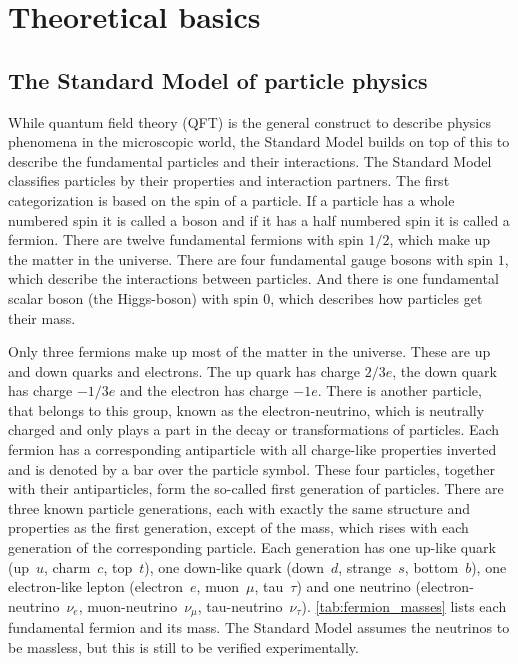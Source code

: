 \chapter{Theoretical basics}


\section{The Standard Model of particle physics}

While quantum field theory (QFT) is the general construct to describe physics phenomena in the microscopic world, the Standard Model builds on top of this to describe the fundamental particles and their interactions.
The Standard Model classifies particles by their properties and interaction partners. 
The first categorization is based on the spin of a particle. If a particle has a whole numbered spin it is called a boson and if it has a half numbered spin it is called a fermion.
There are twelve fundamental fermions with spin $1/2$, which make up the matter in the universe.
There are four fundamental gauge bosons with spin $1$, which describe the interactions between particles. 
And there is one fundamental scalar boson (the Higgs-boson) with spin $0$, which describes how particles get their mass.

Only three fermions make up most of the matter in the universe. These are up and down quarks and electrons.
The up quark has charge $2/3e$, the down quark has charge $-1/3e$ and the electron has charge $-1e$.
There is another particle, that belongs to this group, known as the electron-neutrino, which is neutrally charged and only plays a part in the decay or transformations of particles.
Each fermion has a corresponding antiparticle with all charge-like properties inverted and is denoted by a bar over the particle symbol.
These four particles, together with their antiparticles, form the so-called first generation of particles.
There are three known particle generations, each with exactly the same structure and properties as the first generation, except of the mass, which rises with each generation of the corresponding particle.
Each generation has one up-like quark (up~$u$, charm~$c$, top~$t$), one down-like quark (down~$d$, strange~$s$, bottom~$b$), one electron-like lepton (electron~$e$, muon~$\mu$, tau~$\tau$) and one neutrino (electron-neutrino~$\nu_e$, muon-neutrino~$\nu_\mu$, tau-neutrino~$\nu_\tau$).
\autoref{tab:fermion_masses} lists each fundamental fermion and its mass.
The Standard Model assumes the neutrinos to be massless, but this is still to be verified experimentally.

